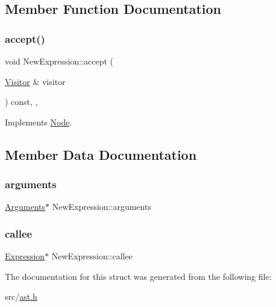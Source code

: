 \subsection{Member Function Documentation}
\mbox{\label{struct_new_expression_a02f3b4798c1351cee31f27d0cbf6346f}} 
\subsubsection{\texorpdfstring{accept()}{accept()}}
{\footnotesize\ttfamily void New\+Expression\+::accept (\begin{DoxyParamCaption}\item[{\hyperlink{struct_visitor}{Visitor} \&}]{visitor }\end{DoxyParamCaption}) const\hspace{0.3cm}{\ttfamily [inline]}, {\ttfamily [override]}, {\ttfamily [virtual]}}



Implements \hyperlink{struct_node_a10bd7af968140bbf5fa461298a969c71}{Node}.



\subsection{Member Data Documentation}
\mbox{\label{struct_new_expression_a4d43c4128966ccb728f92a0204d04eaa}} 
\subsubsection{\texorpdfstring{arguments}{arguments}}
{\footnotesize\ttfamily \hyperlink{struct_arguments}{Arguments}$\ast$ New\+Expression\+::arguments}

\mbox{\label{struct_new_expression_aa56c9b8daa3725a54fdb2b8fce63d237}} 
\subsubsection{\texorpdfstring{callee}{callee}}
{\footnotesize\ttfamily \hyperlink{struct_expression}{Expression}$\ast$ New\+Expression\+::callee}



The documentation for this struct was generated from the following file\+:\begin{DoxyCompactItemize}
\item 
src/\hyperlink{ast_8h}{ast.\+h}\end{DoxyCompactItemize}
